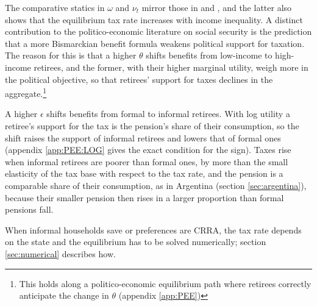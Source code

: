 The comparative statics in $\omega$ and $\nu_t$ mirror those in \textcite{mkvss08} and \textcite{Song12a1}, and the latter also shows that the equilibrium tax rate increases with income inequality. A distinct contribution to the politico-economic literature on social security is the prediction that a more Bismarckian benefit formula weakens political support for taxation. The reason for this is that a higher $\theta$ shifts benefits from low-income to high-income retirees, and the former, with their higher marginal utility, weigh more in the political objective, so that retirees' support for taxes declines in the aggregate.\footnote{This holds along a politico-economic equilibrium path where retirees correctly anticipate the change in $\theta$ (appendix \ref{app:PEE})}

A higher $\epsilon$ shifts benefits from formal to informal retirees. With log utility a retiree's support for the tax is the pension's share of their consumption, so the shift raises the support of informal retirees and lowers that of formal ones (appendix \ref{app:PEE:LOG} gives the exact condition for the sign). Taxes rise when informal retirees are poorer than formal ones, by more than the small elasticity of the tax base with respect to the tax rate, and the pension is a comparable share of their consumption, as in Argentina (section \ref{sec:argentina}), because their smaller pension then rises in a larger proportion than formal pensions fall.


When informal households save or preferences are CRRA, the tax rate depends on the state and the equilibrium has to be solved numerically; section \ref{sec:numerical} describes how.
